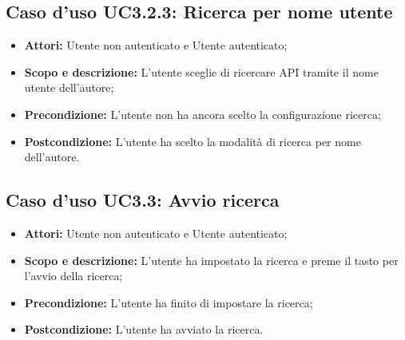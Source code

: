 \documentclass[12pt,a4paper,titlepage]{article}
\begin{document}
\subsection{Caso d'uso UC3.2.3: Ricerca per nome utente}
\begin{itemize}
	\item \textbf{Attori: }Utente non autenticato e Utente autenticato;
	\item \textbf{Scopo e descrizione: }L'utente sceglie di ricercare API tramite il nome utente dell'autore;
	\item \textbf{Precondizione: }L'utente non ha ancora scelto la configurazione ricerca;
	\item \textbf{Postcondizione: }L'utente ha scelto la modalità di ricerca per nome dell'autore.
\end{itemize}
\subsection{Caso d'uso UC3.3: Avvio ricerca}
\begin{itemize}
	\item \textbf{Attori: }Utente non autenticato e Utente autenticato;
	\item \textbf{Scopo e descrizione: }L'utente ha impostato la ricerca e preme il tasto per l'avvio della ricerca;
	\item \textbf{Precondizione: }L'utente ha finito di impostare la ricerca;
	\item \textbf{Postcondizione: }L'utente ha avviato la ricerca.
\end{itemize}
\end{document}

